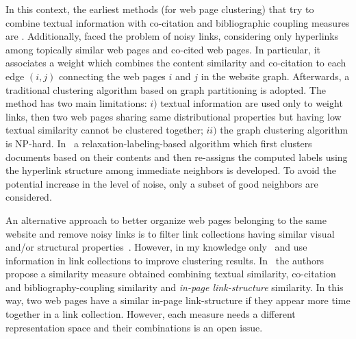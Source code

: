 
In this context, the earliest methods (for web page clustering) that 
try to combine textual information with co-citation and bibliographic coupling measures are \cite{Modha:2000, Wang:2002, Drost:2005}. Additionally, \cite{He:2002} faced the problem of noisy links, considering only hyperlinks among topically similar web pages and co-cited web pages. 
In particular, it associates a weight which combines the content similarity and co-citation to each edge $(i,j)$ connecting the web pages $i$ and $j$ in the website graph. Afterwards, a traditional clustering algorithm based on graph partitioning is adopted. The method has two main limitations: $i)$ textual information are used only to weight links, then two web pages sharing same distributional properties but having low textual similarity cannot be clustered together; $ii)$ the graph clustering algorithm is NP-hard.
In~\cite{Angelova:2006} a relaxation-labeling-based algorithm which first clusters
documents based on their contents and then re-assigns the computed labels using the hyperlink structure among immediate neighbors is developed. To avoid the potential increase in the level of noise,
only a subset of good neighbors are considered. %



An alternative approach to better organize web pages belonging to the same website and remove noisy links is to filter link collections having similar visual and/or structural properties~\cite{Crescenzi:2005, Qi:2006, Weninger:2013, Lin:2010, Lanotte:2014}. However, in my knowledge only~\cite{Crescenzi:2005} and \cite{Lin:2010} use information in link collections to improve clustering results. In~\cite{Lin:2010} the authors propose a similarity measure obtained combining textual similarity, co-citation and bibliography-coupling similarity and \emph{in-page link-structure} similarity. In this way, two web pages have a similar in-page link-structure if they appear more time together in a link collection. However, each measure needs a different representation space and their combinations is an open issue.

